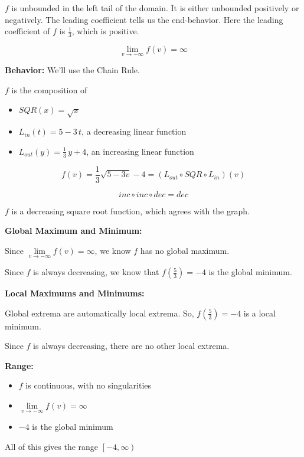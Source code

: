 \documentclass{ximera}
\begin{document}
\begin{example}
$f$ is unbounded in the left tail of the domain. It is either unbounded positively or negatively. The leading coefficient tells us the end-behavior. Here the leading coefficient of $f$ is $\frac{1}{3}$, which is positive.


\[  \lim\limits_{v \to -\infty} f(v) = \infty   \]







\textbf{Behavior:}  We'll use the Chain Rule.

$f$ is the composition of

\begin{itemize}
\item $SQR(x) = \sqrt{x}$ 

\item $L_{in}(t) = 5 - 3 \, t$, a decreasing linear function

\item $L_{out}(y) = \frac{1}{3} \, y + 4$, an increasing linear function
\end{itemize}


\[  f(v) =  \frac{1}{3} \sqrt{5-3v}-4 = (L_{out} \circ SQR \circ L_{in})(v) \]

\[ inc \circ inc \circ dec = dec  \]


$f$ is a decreasing square root function, which agrees with the graph.



\textbf{Global Maximum and Minimum:} 


Since $\lim\limits_{v \to -\infty} f(v) = \infty$, we know $f$ has no global maximum.

Since $f$ is always decreasing, we know that $f\left( \frac{5}{3} \right) = -4$ is the global minimum.


\textbf{Local Maximums and Minimums:} 

Global extrema are automatically local extrema.  So, $f\left( \frac{5}{3} \right) = -4$ is a local minimum.

Since $f$ is always decreasing, there are no other local extrema.


\textbf{Range:} 

\begin{itemize}
\item $f$ is continuous, with no singularities
\item $\lim\limits_{v \to -\infty} f(v) = \infty$
\item $-4$ is the global minimum
\end{itemize}

All of this gives the range  $\left[ -4, \infty \right)$



\end{example}
\end{document}
